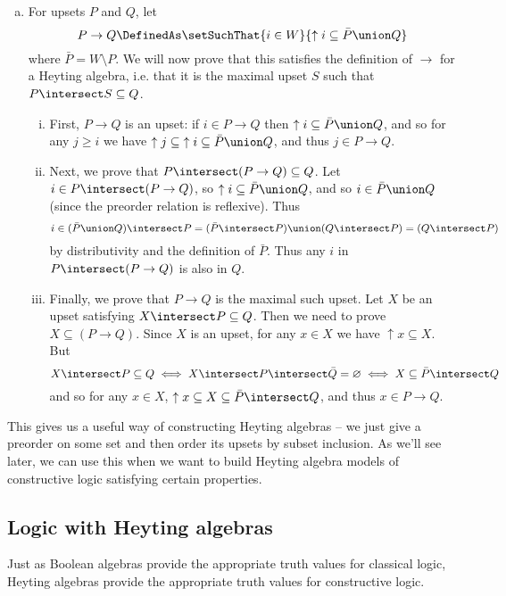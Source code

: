 \begin{Proof}
\begin{enumerate}[(a)]
\item For upsets $P$ and $Q$, let 
\[
P \to Q
\DefinedAs
\setSuchThat{i \in W}{\uparrow i \subseteq \bar{P} \union Q}
\]
where $\bar{P} = W\setminus P$.  We will now prove that this satisfies the definition of $\to$ for a Heyting algebra, i.e. that it is the maximal upset $S$ such that $P \intersect S \subseteq Q$.
\begin{enumerate}[(i)]
\item First, $P \to Q$ is an upset: if 
$i \in P \to Q$ then $\uparrow i \subseteq \bar{P} \union Q$, and so for any $j \geq i$ we have ${\uparrow j} \subseteq {\uparrow i} \subseteq \bar{P} \union Q$, and thus $j \in P \to Q$.
%
\item Next, we prove that $P \intersect (P \to Q) \subseteq Q$.  Let 
$i \in P \intersect (P \to Q)$, so 
$\uparrow i \subseteq \bar{P} \union Q$, and so
$i \in \bar{P} \union Q$ (since the preorder relation is reflexive).  Thus 
\[
i \in (\bar{P} \union Q) \intersect P
= (\bar{P} \intersect P) \union (Q \intersect P)
= (Q \intersect P)
\]
by distributivity and the definition of $\bar{P}$.  Thus any $i$ in $P \intersect (P \to Q)$ is also in $Q$.
%
\item Finally, we prove that $P \to Q$ is the maximal such upset.  Let $X$ be an upset satisfying $X \intersect P \subseteq Q$.  Then we need to prove $X \subseteq (P \to Q)$.  Since $X$ is an upset, for any $x \in X$ we have $\uparrow x \subseteq X$.  But 
\[
X \intersect P \subseteq Q 
\iff
X \intersect P \intersect \bar{Q} = \varnothing
\iff
X \subseteq \bar{P} \intersect Q
\]
and so for any $x \in X$, $\uparrow x \subseteq X \subseteq \bar{P} \intersect Q$, and thus $x \in P \to Q$.
\end{enumerate}
\end{enumerate}
\end{Proof}

This gives us a useful way of constructing Heyting algebras -- we just give a preorder on some set and then order its upsets by subset inclusion.  As we'll see later, we can use this when we want to build Heyting algebra models of constructive logic satisfying certain properties.



\subsection{Logic with Heyting algebras}

Just as Boolean algebras provide the appropriate truth values for classical logic, Heyting algebras provide the appropriate truth values for constructive logic.


